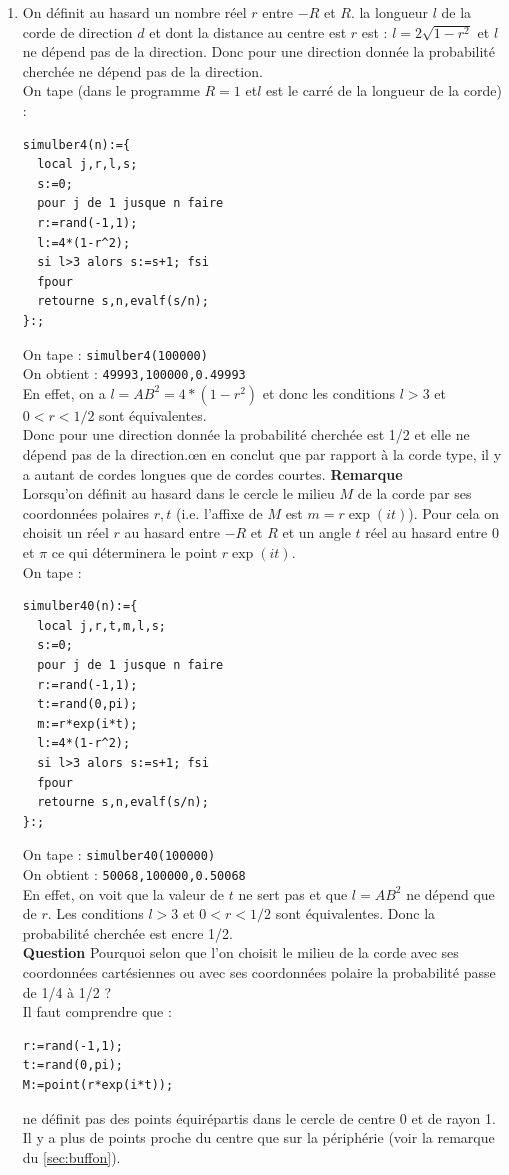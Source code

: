 \documentclass[a4paper,11pt]{book}
\begin{document}
\begin{enumerate}
\item On d\'efinit au hasard un nombre r\'eel $r$ entre $-R$ et $R$. la longueur
  $l$ de la corde de direction $d$ et dont  la distance au centre est 
  $r$ est : $l=2\sqrt{1-r^2}$ et $l$ ne d\'epend pas de la direction. Donc pour 
  une direction donn\'ee la probabilit\'e cherch\'ee ne d\'epend pas de la 
  direction.\\
  On tape (dans le programme $R=1$ et$l$ est le carr\'e de la longueur de la corde) :
\begin{verbatim}
simulber4(n):={
  local j,r,l,s;
  s:=0;
  pour j de 1 jusque n faire
  r:=rand(-1,1);
  l:=4*(1-r^2);
  si l>3 alors s:=s+1; fsi
  fpour
  retourne s,n,evalf(s/n);
}:;
\end{verbatim}
On tape :
{\tt simulber4(100000)}\\
On obtient : {\tt 49993,100000,0.49993}\\
En effet, on a  $l={AB}^2=4*(1-r^2)$ et donc les conditions $l>3$ et $0<r<1/2$ 
sont \'equivalentes.\\ 
Donc pour une direction donn\'ee la probabilit\'e cherch\'ee est 1/2 et elle
ne d\'epend pas de la direction.œn en conclut que par rapport \`a la corde type,
il y a autant de cordes longues que de cordes courtes.
{\bf Remarque}\\
Lorsqu'on d\'efinit au hasard dans le cercle le milieu $M$ de la corde par ses 
coordonn\'ees polaires $r,t$ (i.e. l'affixe de $M$ est $m=r\exp(it)$).
Pour cela on choisit un r\'eel $r$ au hasard entre 
$-R$ et $R$ et un angle $t$ r\'eel au hasard  entre  0 et $\pi$ ce qui 
d\'eterminera le point $r \exp(it)$.\\
On tape :
\begin{verbatim}
simulber40(n):={
  local j,r,t,m,l,s;
  s:=0;
  pour j de 1 jusque n faire
  r:=rand(-1,1);
  t:=rand(0,pi);
  m:=r*exp(i*t);
  l:=4*(1-r^2);
  si l>3 alors s:=s+1; fsi
  fpour
  retourne s,n,evalf(s/n);
}:;
\end{verbatim}
On tape :
{\tt simulber40(100000)}\\
On obtient : {\tt 50068,100000,0.50068}\\
En effet, on voit que la valeur de $t$ ne sert pas et que $l={AB}^2$ ne 
d\'epend que de $r$. Les conditions $l>3$ et $0<r<1/2$ sont \'equivalentes. 
Donc la probabilit\'e cherch\'ee est encre 1/2.\\
{\bf Question} Pourquoi selon que l'on choisit le milieu de la corde avec ses 
coordonn\'ees cart\'esiennes ou avec ses coordonn\'ees polaire la probabilit\'e
passe de 1/4 \`a 1/2 ?\\
Il faut comprendre que :
\begin{verbatim}
r:=rand(-1,1);
t:=rand(0,pi);
M:=point(r*exp(i*t));
\end{verbatim}
ne d\'efinit pas des points \'equir\'epartis dans le cercle de centre $0$ et de 
rayon 1.\\
Il y a plus de points proche du centre que sur la p\'eriph\'erie (voir la remarque du \ref{sec:buffon}).
\end{enumerate}
\end{document}
